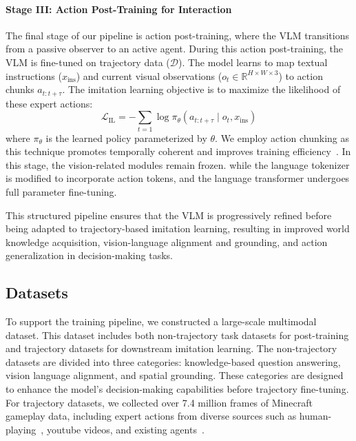 \paragraph{Stage III: Action Post-Training for Interaction} The final stage of our pipeline is action post-training, where the VLM transitions from a passive observer to an active agent. During this action post-training, the VLM is fine-tuned on trajectory data ($\mathcal{D}$). The model learns to map textual instructions ($x_{\text{ins}}$) and current visual observations ($o_t \in \mathbb{R}^{H\times W\times 3}$) to action chunks $a_{t:t+\tau}$. The imitation learning objective is to maximize the likelihood of these expert actions:
\begin{equation}
\label{equation:3}
\mathcal{L}_\text{IL} = - \sum_{t=1} \log \pi_\theta (a_{t:t+\tau} \mid o_t, x_{\text{ins}}) \tag{2}
\end{equation}
where $\pi_\theta$ is the learned policy parameterized by $\theta$. We employ action chunking as this technique promotes temporally coherent and improves training efficiency~\citep{openvla-oft}. In this stage, the vision-related modules remain frozen. while the language tokenizer is modified to incorporate action tokens,
and the language transformer undergoes full parameter fine-tuning.

This structured pipeline ensures that the VLM is progressively refined before being adapted to trajectory-based imitation learning, resulting in improved world knowledge acquisition, vision-language alignment and grounding, and action generalization in decision-making tasks.

\subsection{Datasets}
\label{sec:datasets}

To support the \method training pipeline, we constructed a large-scale multimodal dataset. This dataset includes both non-trajectory task datasets for post-training and trajectory datasets for downstream imitation learning. The non-trajectory datasets are divided into three categories: knowledge-based question answering, vision language alignment, and spatial grounding. These categories are designed to enhance the model’s decision-making capabilities before trajectory fine-tuning. For trajectory datasets, we collected over 7.4 million frames of Minecraft gameplay data, including expert actions from diverse sources such as human-playing~\citep{vpt}, youtube videos, and existing agents~\citep{jarvis1}.



